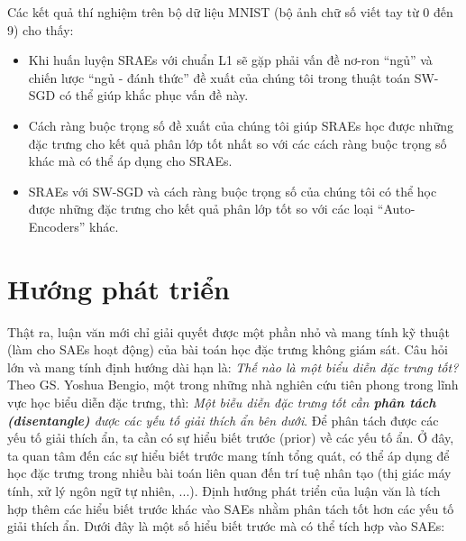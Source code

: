Các kết quả thí nghiệm trên bộ dữ liệu MNIST (bộ ảnh chữ số viết tay từ 0 đến 9) cho thấy:
\begin{itemize}
	\item Khi huấn luyện SRAEs với chuẩn L1 sẽ gặp phải vấn đề nơ-ron ``ngủ'' và chiến lược ``ngủ - đánh thức'' đề xuất của chúng tôi trong thuật toán SW-SGD có thể giúp khắc phục vấn đề này.
	\item Cách ràng buộc trọng số đề xuất của chúng tôi giúp SRAEs học được những đặc trưng cho kết quả phân lớp tốt nhất so với các cách ràng buộc trọng số khác mà có thể áp dụng cho SRAEs.
	\item SRAEs với SW-SGD và cách ràng buộc trọng số của chúng tôi có thể học được những đặc trưng cho kết quả phân lớp tốt so với các loại ``Auto-Encoders'' khác.
\end{itemize}
\section{Hướng phát triển} 
Thật ra, luận văn mới chỉ giải quyết được một phần nhỏ và mang tính kỹ thuật (làm cho SAEs hoạt động) của bài toán học đặc trưng không giám sát. Câu hỏi lớn và mang tính định hướng dài hạn là: \emph{Thế nào là một biểu diễn đặc trưng tốt?} Theo GS. Yoshua Bengio, một trong những nhà nghiên cứu tiên phong trong lĩnh vực học biểu diễn đặc trưng, thì: \emph{Một biễu diễn đặc trưng tốt cần \textbf{phân tách (disentangle)} được các yếu tố giải thích ẩn bên dưới}. Để phân tách được các yếu tố giải thích ẩn, ta cần có sự hiểu biết trước (prior) về các yếu tố ẩn. Ở đây, ta quan tâm đến các sự hiểu biết trước mang tính tổng quát, có thể áp dụng để học đặc trưng trong nhiều bài toán liên quan đến trí tuệ nhân tạo (thị giác máy tính, xử lý ngôn ngữ tự nhiên, ...). Định hướng phát triển của luận văn là tích hợp thêm các hiểu biết trước khác vào SAEs nhằm phân tách tốt hơn các yếu tố giải thích ẩn. Dưới đây là một số hiểu biết trước mà có thể tích hợp vào SAEs:
